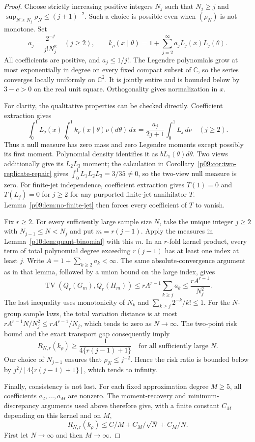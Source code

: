 \documentclass[11pt,letterpaper]{article}
\theoremstyle{definition}
\theoremstyle{remark}
\newcommand{\1}{\mathbf 1}
\begin{document}
\begin{proof}
Choose strictly increasing positive integers $N_j$ such that
$N_j\ge j$ and $\sup_{N\ge N_j}\rho_N\le(j+1)^{-2}$.
Such a choice is possible even when $(\rho_N)$ is not monotone.  Set
\[
 a_j=\frac{2^{-j}}{j!N_j^2}\quad(j\ge2),\qquad
 k_\rho(x\mid\theta)=1+\sum_{j=2}^{\infty}
                   a_jL_j(x)L_j(\theta).
\]
All coefficients are positive, and $a_j\le1/j!$.  The Legendre
polynomials grow at most exponentially in degree on every fixed
compact subset of $\mathbb C$, so the series converges locally
uniformly on $\mathbb C^2$.  It is jointly entire and is bounded
below by $3-e>0$ on the real unit square.  Orthogonality gives
normalization in $x$.

For clarity, the qualitative properties can be checked directly.
Coefficient extraction gives
\[
 \int_0^1L_j(x)\int_0^1 k_\rho(x\mid\theta)\nu(d\theta)\,dx
   =\frac{a_j}{2j+1}\int_0^1L_j\,d\nu\quad(j\ge2).
\]
Thus a null measure has zero mass and zero Legendre moments except
possibly its first moment.  Polynomial density identifies it as
$bL_1(\theta)d\theta$.  Two views additionally give its $L_2L_3$ moment; the calculation in
Corollary~\ref{p09:cor:two-replicate-repair} gives
$\int_0^1L_1L_2L_3=3/35\ne0$, so the two-view null measure is zero.
For finite-jet independence, coefficient extraction gives $T(1)=0$
and $T(L_j)=0$ for $j\ge2$ for any purported finite-jet annihilator
$T$. Lemma~\ref{p09:lem:no-finite-jet} then forces every coefficient
of $T$ to vanish.

Fix $r\ge2$.  For every sufficiently large sample size $N$, take
the unique integer $j\ge2$ with $N_{j-1}\le N<N_j$ and put
$m=r(j-1)$.  Apply the measures in
Lemma~\ref{p10:lem:quant-binomial} with this $m$.  In an $r$-fold
kernel product, every term of total polynomial degree exceeding
$r(j-1)$ has at least one index at least $j$.  Write
$A=1+\sum_{k\ge2}a_k<\infty$.  The same absolute-convergence
argument as in that lemma, followed by a union bound on the
large index, gives
\[
 \operatorname{TV}(Q_r(G_m),Q_r(H_m))
 \le rA^{r-1}\sum_{k\ge j}a_k
 \le\frac{rA^{r-1}}{N_j^2}.
\]
The last inequality uses monotonicity of $N_k$ and
$\sum_{k\ge j}2^{-k}/k!\le1$.  For the $N$-group sample laws,
the total variation distance is at most
$rA^{r-1}N/N_j^2\le rA^{r-1}/N_j$, which tends to zero
as $N\to\infty$.  The two-point risk bound and the exact
transport gap consequently imply
\[
 R_{N,r}(k_\rho)\ge\frac1{4\{r(j-1)+1\}}
 \quad\text{for all sufficiently large }N.
\]
Our choice of $N_{j-1}$ ensures that $\rho_N\le j^{-2}$.
Hence the risk ratio is bounded below by
$j^2/[4\{r(j-1)+1\}]$, which tends to infinity.

Finally, consistency is not lost.  For each fixed approximation
degree $M\ge5$, all coefficients $a_2,\ldots,a_M$ are nonzero.
The moment-recovery and minimum-discrepancy arguments used above
therefore give, with a finite constant $C_M$ depending on this
kernel and on $M$,
\[
 R_{N,r}(k_\rho)\le C/M+C_M/\sqrt N+C_M/N.
\]
First let $N\to\infty$ and then $M\to\infty$.
\end{proof}
\end{document}
